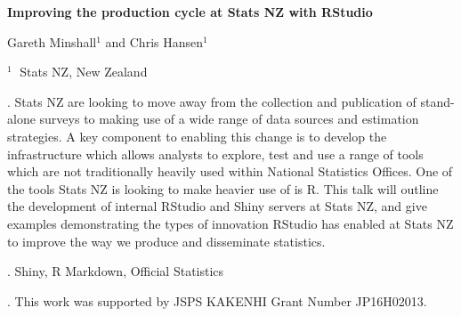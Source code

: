 \documentclass[12pt]{article}
\begin{document}
\begin{flushleft}


{\LARGE\bf Improving the production cycle at Stats NZ with RStudio}


\vspace{1.0cm}

Gareth Minshall$^1$ and Chris Hansen$^1$ 

\begin{description}

\item $^1 \;$ Stats NZ, New Zealand

\end{description}

\end{flushleft}


\vspace{0.75cm}

. Stats  NZ  are  looking  to  move  away  from  the  collection  and  publication  of  stand-alone surveys  to  making  use  of a  wide  range  of  data  sources  and  estimation  strategies.  A key component to enabling this change is to develop the infrastructure which allows analysts to explore, test and use a range of tools which are not traditionally heavily used within National Statistics Offices.  One of the tools Stats NZ is looking to make heavier use of is R.  This talk will outline the development of internal RStudio and Shiny servers at Stats NZ, and give examples demonstrating the types of innovation RStudio has enabled at Stats NZ to improve the way we produce and disseminate statistics.

\vskip 2mm

.
Shiny, R Markdown, Official Statistics

\vskip 2mm

. This work was supported by JSPS KAKENHI Grant Number JP16H02013.
\end{document}
